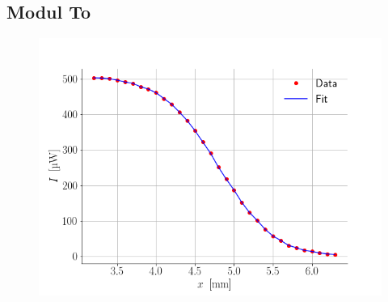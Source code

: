 \documentclass[main]{subfiles}
\begin{document}
\subsection{Modul To}
\begin{figure}[H]
    \centering
    \includegraphics[width=\linewidth]{tegninger/graf3.png}
    \caption{}
    \label{fig:graf3}
\end{figure}
\end{document}
